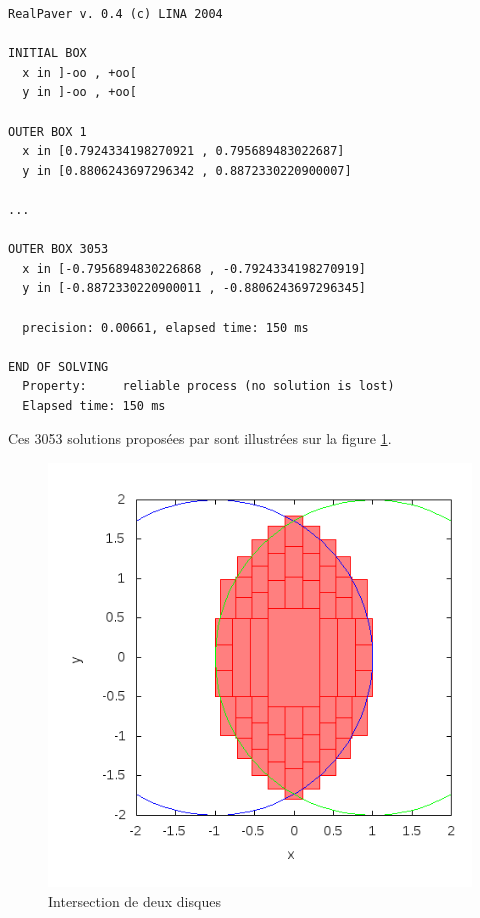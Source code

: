 \begin{verbatim}
RealPaver v. 0.4 (c) LINA 2004

INITIAL BOX
  x in ]-oo , +oo[
  y in ]-oo , +oo[

OUTER BOX 1
  x in [0.7924334198270921 , 0.795689483022687]
  y in [0.8806243697296342 , 0.8872330220900007]

...

OUTER BOX 3053
  x in [-0.7956894830226868 , -0.7924334198270919]
  y in [-0.8872330220900011 , -0.8806243697296345]

  precision: 0.00661, elapsed time: 150 ms

END OF SOLVING
  Property:     reliable process (no solution is lost)
  Elapsed time: 150 ms
\end{verbatim}
Ces 3053 solutions proposées par \realpaver{} sont illustrées sur la figure \ref{fig:DisqueDisque}.
\begin{figure}[ht!] %
  \center
\includegraphics[scale=0.40]{img/disk-disk}
  \caption{Intersection de deux disques} %
 \label{fig:DisqueDisque} %
\end{figure} %
\clearpage
